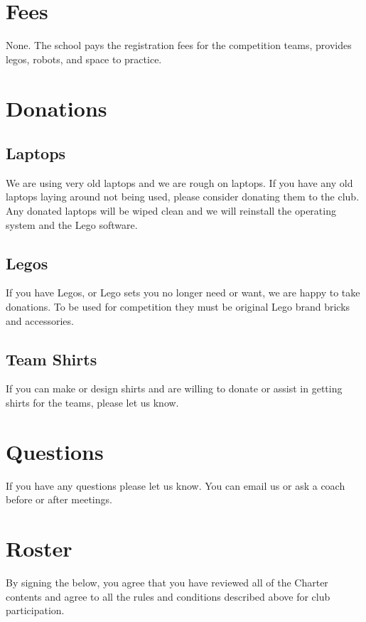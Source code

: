 \documentclass[letter]{article}
\begin{document}
\section{Fees}

None.  The school pays the registration fees for the competition teams, provides legos, robots, and space to practice.

\hypertarget{donations}{%
\section{Donations}\label{donations}}

\subsection{Laptops}

We are using very old laptops and we are rough on laptops.  If you have any old laptops laying around not being used, please consider donating them to the club.  Any donated laptops will be wiped clean and we will reinstall the operating system and the Lego software.

\subsection{Legos}

If you have Legos, or Lego sets you no longer need or want, we are happy to take donations.  To be used for competition they must be original Lego brand bricks and accessories.

\subsection{Team Shirts}

If you can make or design shirts and are willing to donate or assist in getting shirts for the teams, please let us know.

\section{Questions}

If you have any questions please let us know. You can email us or ask a coach
before or after meetings.

\section{Roster}

By signing the below, you agree that you have reviewed all of the Charter contents and agree to all the rules and conditions described above for club participation.
\end{document}
